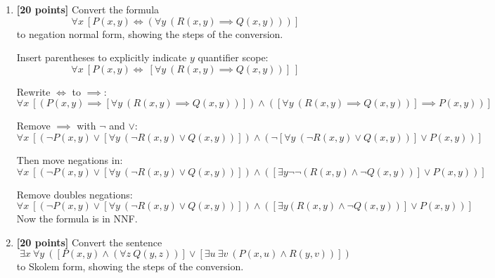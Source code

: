 \documentclass{article}
\begin{document}
\begin{enumerate}
\item \textbf{[20 points]} Convert the formula
  \begin{displaymath}
    \forall x\ [P(x,y) \iff (\forall y\ (R(x,y) \implies Q(x,y)))]
  \end{displaymath}
  to negation normal form, showing the steps of the conversion.
  
  \begin{answer}
    Insert parentheses to explicitly indicate $y$ quantifier scope:\\
    \begin{displaymath}
      \forall x\ [P(x,y) \iff \ [ \forall y\ (R(x,y) \implies Q(x,y))]\ ]
    \end{displaymath}

    Rewrite $\iff$ to $\implies$:\\
    \begin{displaymath}
      \forall x\ [(P(x,y) \implies [\forall y\ (R(x,y) \implies Q(x,y))]) 
      \land ([\forall y\ (R(x,y) \implies Q(x,y))] \implies P(x, y))]
    \end{displaymath}
    
    Remove  $\implies$ with $\neg$ and $\lor$:\\
    \begin{displaymath}
      \forall x\ [ (\neg P(x,y) \lor [\forall y\ (\neg R(x,y) \lor Q(x,y))]) 
      \land (\neg [\forall y\ (\neg R(x,y) \lor Q(x,y))] \lor P(x, y))]
    \end{displaymath}

    Then move negations in:\\
    \begin{displaymath}
      \forall x\ [ (\neg P(x,y) \lor [\forall y\ (\neg R(x,y) \lor Q(x,y))]) 
      \land ([\exists y \neg \neg (R(x,y) \land \neg Q(x,y))] \lor P(x, y))]
    \end{displaymath}

    Remove doubles negations:\\
    \begin{displaymath}
      \forall x\ [ (\neg P(x,y) \lor [\forall y\ (\neg R(x,y) \lor Q(x,y))]) 
      \land ([\exists y (R(x,y) \land \neg Q(x,y))] \lor P(x, y))]
    \end{displaymath}
    Now the formula is in NNF.
  \end{answer}
\item \textbf{[20 points]} Convert the sentence
  \begin{displaymath}
    \exists x\ \forall y\ \left( [P(x,y) \land (\forall z\ Q(y,z))] \lor
      [\exists u\ \exists v\ (P(x,u) \land R(y,v))] \right)
  \end{displaymath}
  to Skolem form, showing the steps of the conversion.


\end{enumerate}
\end{document}
